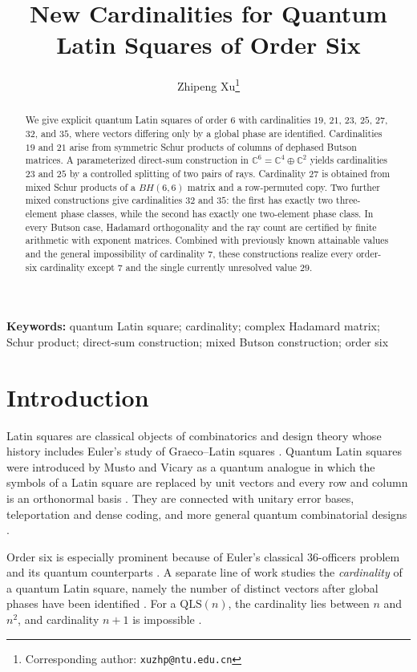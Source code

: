 \documentclass[11pt,a4paper]{article}
\title{New Cardinalities for Quantum Latin Squares of Order Six}
\author[1]{Zhipeng Xu\thanks{Corresponding author: \texttt{xuzhp@ntu.edu.cn}}}
\affil[1]{School of Mathematics and Statistics, Nantong University, Nantong, China}
\date{}
\newcommand{\C}{\mathbb{C}}
\newcommand{\QLS}{\mathrm{QLS}}
\begin{document}
\maketitle

\begin{abstract}
We give explicit quantum Latin squares of order $6$ with cardinalities
$19$, $21$, $23$, $25$, $27$, $32$, and $35$, where vectors differing only
by a global phase are identified.  Cardinalities $19$ and $21$ arise from
symmetric Schur products of columns of dephased Butson matrices.  A
parameterized direct-sum construction in $\C^6=\C^4\oplus\C^2$ yields
cardinalities $23$ and $25$ by a controlled splitting of two pairs of rays.
Cardinality $27$ is obtained from mixed Schur products of a $BH(6,6)$ matrix
and a row-permuted copy.  Two further mixed constructions give cardinalities
$32$ and $35$: the first has exactly two three-element phase classes, while
the second has exactly one two-element phase class.  In every Butson case,
Hadamard orthogonality and the ray count are certified by finite arithmetic
with exponent matrices.  Combined with previously known attainable values
and the general impossibility of cardinality $7$, these constructions realize
every order-six cardinality except $7$ and the single currently unresolved
value $29$.
\end{abstract}

\noindent\textbf{Keywords:}
quantum Latin square; cardinality; complex Hadamard matrix; Schur product;
direct-sum construction; mixed Butson construction; order six

\section{Introduction}

Latin squares are classical objects of combinatorics and design theory whose
history includes Euler's study of Graeco--Latin squares
\cite{Euler1782,DenesKeedwell1974,ColbournDinitz2007}.  Quantum Latin squares
were introduced by Musto and Vicary as a quantum analogue in which the symbols
of a Latin square are replaced by unit vectors and every row and column is an
orthonormal basis \cite{MustoVicary2016}.  They are connected with unitary
error bases, teleportation and dense coding, and more general quantum
combinatorial designs \cite{Werner2001,GoyenecheEtAl2018,MustoVicary2019}.

Order six is especially prominent because of Euler's classical 36-officers
problem and its quantum counterparts \cite{RatherEtAl2022,ZyczkowskiEtAl2023}.
A separate line of work studies the \emph{cardinality} of a quantum Latin
square, namely the number of distinct vectors after global phases have been
identified \cite{PaczosEtAl2021,ZhangWangJi2025,ZangEtAl2025,ZhangCao2026,
ZhangJi2026}.  For a $\QLS(n)$, the cardinality lies between $n$ and $n^2$,
and cardinality $n+1$ is impossible \cite{ZangEtAl2025,ZhangJi2026}.
\end{document}
